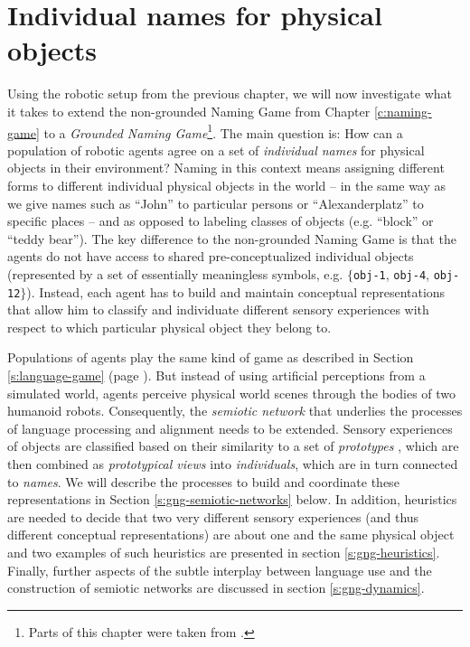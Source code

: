 
\setcounter{chapter}{7}

\chapter{Individual names for physical objects}
\label{c:gng}
\label{s:grounded-naming-game}


Using the robotic setup from the previous chapter, we will now
investigate what it takes to extend the non-grounded Naming Game from
Chapter \ref{c:naming-game} to a \emph{Grounded Naming
  Game}\footnote{Parts of this chapter were taken from
  \citealp*{steels12grounded-naming-game,loetzsch12grounding,steels12sue}.}.
The main question is: How can a population of robotic agents agree on
a set of \emph{individual names} for physical objects in their
environment?  Naming in this context means assigning different forms
to different individual physical objects in the world -- in the same
way as we give names such as ``John'' to particular persons or
``Alexanderplatz'' to specific places -- and as opposed to labeling
classes of objects (e.g. ``block'' or ``teddy bear''). The key
difference to the non-grounded Naming Game is that the agents do not
have access to shared pre-conceptualized individual objects
(represented by a set of essentially meaningless symbols,
e.g. $\{${\tt obj-1}, {\tt obj-4}, {\tt obj-12}$\}$). Instead, each
agent has to build and maintain conceptual representations that allow
him to classify and individuate different sensory experiences with
respect to which particular physical object they belong to.

 
Populations of agents play the same kind of game as described in
Section \ref{s:language-game} (page \pageref{s:language-game}).  But
instead of using artificial perceptions from a simulated world, agents
perceive physical world scenes through the bodies of two humanoid
robots. Consequently, the \emph{semiotic network} that underlies the
processes of language processing and alignment needs to be
extended. Sensory experiences of objects are classified based on their
similarity to a set of \emph{prototypes}
\citep{edelman98representation}, which are then combined as
\emph{prototypical views} into \emph{individuals}, which are in turn
connected to \emph{names}. We will describe the processes to build and
coordinate these representations in Section
\ref{s:gng-semiotic-networks} below. In addition, heuristics are
needed to decide that two very different sensory experiences (and thus
different conceptual representations) are about one and the same
physical object and two examples of such heuristics are presented in
section \ref{s:gng-heuristics}. Finally, further aspects of the subtle
interplay between language use and the construction of semiotic
networks are discussed in section \ref{s:gng-dynamics}.


